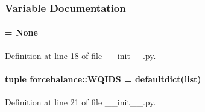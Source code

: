 \subsubsection{\-Variable \-Documentation}
\hypertarget{namespaceforcebalance_a9cf7d53eb5cdb4db2b876eb59ba83075}{
\paragraph[{\-W\-O\-R\-K\-\_\-\-Q\-U\-E\-U\-E}]{ = \-None}}\label{namespaceforcebalance_a9cf7d53eb5cdb4db2b876eb59ba83075}


\-Definition at line 18 of file \-\_\-\-\_\-init\-\_\-\-\_\-.\-py.

\hypertarget{namespaceforcebalance_a77a3598d98b784c79e15e9fef3a1c72c}{
\paragraph[{\-W\-Q\-I\-D\-S}]{\setlength{\rightskip}{0pt plus 5cm}tuple {\bf forcebalance\-::\-W\-Q\-I\-D\-S} = defaultdict(list)}}\label{namespaceforcebalance_a77a3598d98b784c79e15e9fef3a1c72c}


\-Definition at line 21 of file \-\_\-\-\_\-init\-\_\-\-\_\-.\-py.

